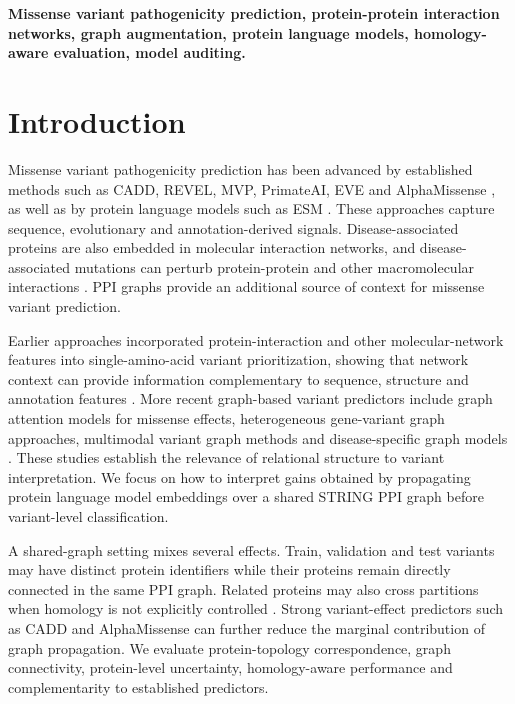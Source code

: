\documentclass[conference]{IEEEtran}
\begin{document}
\begin{IEEEkeywords}
\bfseries\boldmath
Missense variant pathogenicity prediction, protein-protein interaction networks, graph augmentation, protein language models, homology-aware evaluation, model auditing.
\end{IEEEkeywords}

\section{Introduction}

Missense variant pathogenicity prediction has been advanced by established methods such as CADD, REVEL, MVP, PrimateAI, EVE and AlphaMissense \cite{Kircher2014CADD,Ioannidis2016REVEL,Qi2021MVP,Sundaram2018PrimateAI,Frazer2021EVE,Cheng2023AlphaMissense}, as well as by protein language models such as ESM \cite{Lin2023ESM}. These approaches capture sequence, evolutionary and annotation-derived signals. Disease-associated proteins are also embedded in molecular interaction networks, and disease-associated mutations can perturb protein-protein and other macromolecular interactions \cite{Barabasi2011NetworkMedicine,Menche2015DiseaseModules,Sahni2015InteractionPerturbation,Chen2018InteractomePerturbation}. PPI graphs provide an additional source of context for missense variant prediction.

Earlier approaches incorporated protein-interaction and other molecular-network features into single-amino-acid variant prioritization, showing that network context can provide information complementary to sequence, structure and annotation features \cite{Yates2014SuSPect,Ozturk2022NetworkFeatures}. More recent graph-based variant predictors include graph attention models for missense effects, heterogeneous gene-variant graph approaches, multimodal variant graph methods and disease-specific graph models \cite{Zhang2022gMVP,Cheng2021VEGN,Yu2025GNNMAP,Ghadie2025DiseaseSpecificGNN}. These studies establish the relevance of relational structure to variant interpretation. We focus on how to interpret gains obtained by propagating protein language model embeddings over a shared STRING PPI graph before variant-level classification.

A shared-graph setting mixes several effects. Train, validation and test variants may have distinct protein identifiers while their proteins remain directly connected in the same PPI graph. Related proteins may also cross partitions when homology is not explicitly controlled \cite{Littmann2022ProteinMLTips,Teufel2023GraphPart}. Strong variant-effect predictors such as CADD and AlphaMissense can further reduce the marginal contribution of graph propagation. We evaluate protein-topology correspondence, graph connectivity, protein-level uncertainty, homology-aware performance and complementarity to established predictors.
\end{document}
